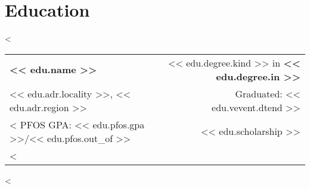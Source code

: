 \section{Education}

<%
\begin{tabularx}{0.97\linewidth}{Xr}
\textbf{<< edu.name >>} & << edu.degree.kind >> in \textbf{<< edu.degree.in >>} \\
<< edu.adr.locality >>, << edu.adr.region >> & Graduated: << edu.vevent.dtend >> \\
<%
PFOS GPA: << edu.pfos.gpa >>/<< edu.pfos.out_of >> & << edu.scholarship >> \\
<%
\end{tabularx}
<%
